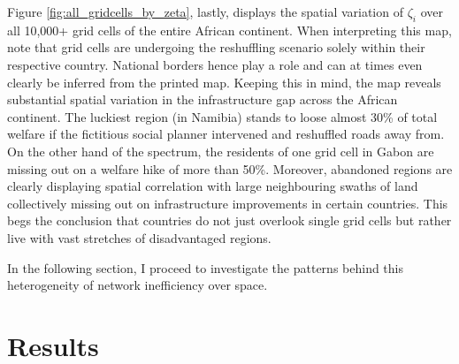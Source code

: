 \documentclass[11pt, oneside]{article}   	%
\begin{document}
Figure \ref{fig:all_gridcells_by_zeta}, lastly, displays the spatial variation of $\zeta_{i}$ over all 10,000+ grid cells of the entire African continent. When interpreting this map, note that grid cells are undergoing the reshuffling scenario solely within their respective country. National borders hence play a role and can at times even clearly be inferred from the printed map. Keeping this in mind, the map reveals substantial spatial variation in the infrastructure gap across the African continent. The luckiest region (in Namibia) stands to loose almost 30\% of total welfare if the fictitious social planner intervened and reshuffled roads away from. On the other hand of the spectrum, the residents of one grid cell in Gabon are missing out on a welfare hike of more than 50\%. Moreover, abandoned regions are clearly displaying spatial correlation with large neighbouring swaths of land collectively missing out on infrastructure improvements in certain countries. This begs the conclusion that countries do not just overlook single grid cells but rather live with vast stretches of disadvantaged regions.

In the following section, I proceed to investigate the patterns behind this heterogeneity of network inefficiency over space.

\section{Results}
\end{document}

